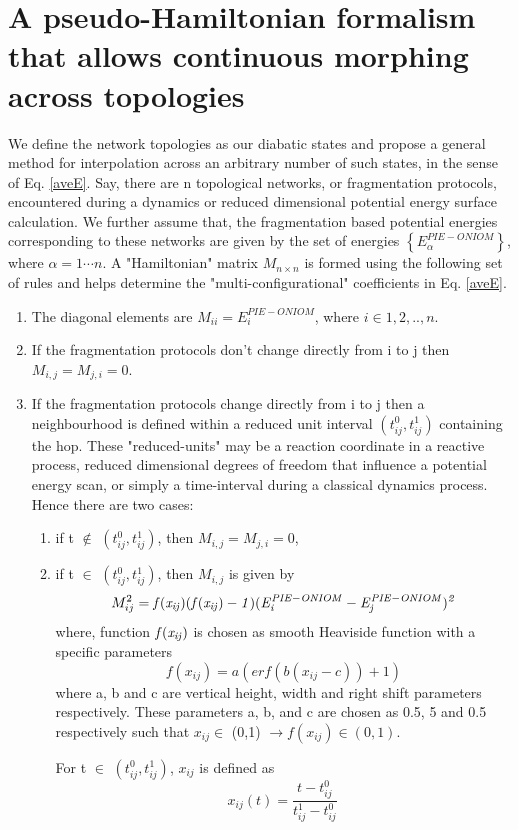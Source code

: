 \section{A pseudo-Hamiltonian formalism that allows continuous morphing across topologies}
{\label{CTMSection}}
We define the network topologies as our diabatic states and propose a general method
for interpolation across an arbitrary number of such states, in the sense of Eq. \ref{aveE}.
Say, there are n topological networks, or fragmentation protocols, encountered during a dynamics
or reduced dimensional
potential energy surface calculation. We further assume that, the fragmentation based potential
energies corresponding to these networks are given by the set of energies
$\left\{ E_\alpha^{PIE-ONIOM} \right\}$, where $\alpha = 1 \cdots n$. 
A "Hamiltonian" matrix $M_{n \times n}$ is formed using the following set of rules and helps
determine the "multi-configurational" coefficients in Eq. \ref{aveE}.
\begin{enumerate}
  \item The diagonal elements are $M_{ii} = E^{PIE-ONIOM}_{i}$, where $i \in {1, 2,.., n}$.
  \item If the fragmentation protocols don't change directly from i to j then $M_{i,j} = M_{j,i} = 0$.
  \item If the fragmentation protocols change directly from i to j then a neighbourhood
  is defined within a reduced unit interval $(t_{ij}^{0},t_{ij}^{1})$ containing the hop. These
  "reduced-units" may be a reaction coordinate in a reactive process, reduced dimensional degrees
  of freedom that influence a potential energy scan, or simply a time-interval during a classical
  dynamics process. Hence there are two cases:
  \begin{enumerate}
    \item if t $\not\in$ $(t_{ij}^{0},t_{ij}^{1})$, then $M_{i,j} = M_{j,i} = 0$,
    \item if t $\in$ $(t_{ij}^{0},t_{ij}^{1})$, then $M_{i,j}$ is given by
    \begin{equation}
    M_{ij}^{2} = \it f(x_{ij})(f(x_{ij})-1)(E^{PIE-ONIOM}_i-E^{PIE-ONIOM}_j)^{2}
    \label{offDiagEquation}
    \end{equation}
    \noindent where, function $\it f(x_{ij})$ is chosen as smooth Heaviside function with a specific parameters
    \begin{equation}
    f(x_{ij}) = a(erf(b(x_{ij}-c)) + 1)
    \label{fx_function}
    \end{equation}
    \noindent where a, b and c are vertical height, width and right shift parameters
    respectively. These parameters a, b, and c are chosen as 0.5, 5 and 0.5 respectively
    such that $x_{ij} \in$ (0,1) $\rightarrow f(x_{ij}) \in (0,1)$.

    For t $\in$ $(t_{ij}^{0},t_{ij}^{1})$, $x_{ij}$ is defined as
    \begin{equation}
    x_{ij}(t) = \frac{t-t_{ij}^{0}}{t_{ij}^{1}-t_{ij}^{0}}\,
    \label{paramEquation}
    \end{equation}
  \end{enumerate}
\end{enumerate}

